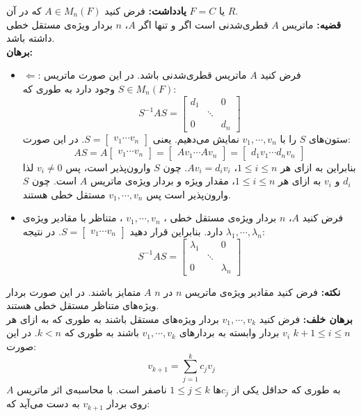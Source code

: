 \textbf{یادداشت:} فرض کنید $A \in M_n(F)$ که در آن $F = C \text{ یا } R$.\\
\textbf{قضیه:} ماتریس $A$ قطری‌شدنی است اگر و تنها اگر $A$، $n$ بردار ویژه‌ی مستقل خطی داشته باشد.\\
\textbf{برهان:}
\begin{itemize}
	\item $\Leftarrow$: فرض کنید $A$ ماتریس قطری‌شدنی باشد. در این صورت ماتریس $S \in M_n(F)$ وجود دارد به طوری که:
	$$S^{-1}AS = \begin{bmatrix}
	d_1 &&0\\
	& \ddots &\\
	0&&d_n
	\end{bmatrix}$$
	ستون‌های $S$ را با $v_1 , \cdots , v_n$ نمایش می‌دهیم. یعنی $S = \begin{bmatrix}
	v_1 \cdots v_n
	\end{bmatrix}$. در این صورت:
	$$AS = A \begin{bmatrix}
	v_1 \cdots v_n
	\end{bmatrix} = \begin{bmatrix}
	Av_1 \cdots Av_n
	\end{bmatrix} = \begin{bmatrix}
	d_1v_1 \cdots d_nv_n
	\end{bmatrix}$$
	بنابراین به ازای هر $1\leq i \leq n$، $Av_i = d_iv_i$. چون $S$ وارون‌پذیر است، پس $v_i\neq 0$ لذا $d_i$ و $v_i$ به ازای هر $1\leq i \leq n $، مقدار ویژه و بردار ویژه‌ی ماتریس $A$ است. چون $S$ وارون‌پذیر است پس $v_1 , \cdots, v_n$ مستقل خطی هستند.
	\item فرض کنید $A$، $n$ بردار ویژه‌ی مستقل خطی ، $v_1 , \cdots, v_n$ ، متناظر با مقادیر ویژه‌ی $\lambda_1, \cdots, \lambda_n$ دارد. بنابراین قرار دهید $S = \begin{bmatrix}
	v_1 \cdots v_n
	\end{bmatrix}$. در نتیجه:
	$$S^{-1} AS = \begin{bmatrix}
	\lambda_1 && 0\\
	& \ddots &\\
	0 & & \lambda_n
	\end{bmatrix}$$
\end{itemize}
\textbf{نکته:} فرض کنید مقادیر ویژه‌ی ماتریس $n$ در $n$ $A$ متمایز باشند. در این صورت بردار ویژه‌های متناظر مستقل خطی هستند.\\
\textbf{برهان خلف:} فرض کنید $v_1 , \cdots , v_k$ بردار ویژه‌های مستقل باشند به طوری که به ازای هر $k+1\leq i \leq n$ $v_i$ بردار وابسته به بردار‌های $v_1 , \cdots , v_k$ باشند به طوری که $k<n$. در این صورت:
$$v_{k+1} = \sum_{j=1}^k c_j v_j $$ 
به طوری که حداقل یکی از $c_j$ها $1\leq j \leq k$ ناصفر است. با محاسبه‌ی اثر ماتریس $A$ روی بردار $v_{k+1}$ به دست می‌آيد که:








